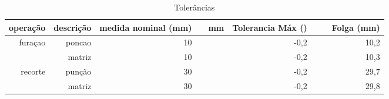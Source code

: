 \begin{table}[htbp]
  \centering
  \caption{Tolerâncias}
    \begin{tabular}{rrrrrrrrr}
    \toprule
    operação & descrição & medida nominal (mm) &       & mm    & Tolerancia Máx () &       &       & Folga (mm) \\
    \midrule
    furaçao & poncao & 10    &       &       & -0,2  &       &       & 10,2 \\
          & matriz & 10    &       &       & -0,2  &       &       & 10,3 \\
    recorte & punção & 30    &       &       & -0,2  &       &       & 29,7 \\
          & matriz & 30    &       &       & -0,2  &       &       & 29,8 \\
    \bottomrule
    \end{tabular}%
  \label{tab:addlabel}%
\end{table}